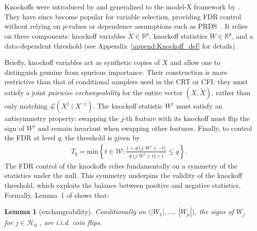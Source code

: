 \documentclass{article}
\theoremstyle{plain}
\newtheorem{lemma}[theorem]{Lemma}
\theoremstyle{definition}
\theoremstyle{remark}
\begin{document}
 

Knockoffs were introduced by \citet{barber-candes2015} and generalized to the model-X framework by \citet{candes2018panning}. They have since become popular for variable selection, providing FDR control without relying on $p$-values or dependence assumptions such as PRDS~\cite{BH}. It relies on three components: knockoff variables $\widetilde{X} \in \mathbb{R}^p$, knockoff statistics $W \in \mathbb{R}^p$, and a data-dependent threshold (see Appendix~\ref{append:Knockoff_def} for details).

Briefly, knockoff variables act as synthetic copies of $X$ and allow one to distinguish genuine from spurious importance. Their construction is more restrictive than that of conditional samplers used in the CRT or CFI: they must satisfy a joint \emph{pairwise exchangeability} for the entire vector $(X, \widetilde{X})$, rather than only matching $\mathcal{L}(X^j \mid X^{-j})$. The knockoff statistic $W^j$ must satisfy an antisymmetry property: swapping the $j$-th feature with its knockoff must flip the sign of $W^j$ and remain invariant when swapping other features. Finally, to control the FDR at level $q$, the threshold is given by
%
 \begin{align}
    T_q=\mathrm{min}\left\{t\in \mathcal{W}:\frac{1+\#\{j:W^j\leq -t\}}{\#\{j:W^j\geq t\}\vee 1}\leq q \right\}.\label{eq:knockoff-threshold}
\end{align}
%
The FDR control of the knockoffs relies fundamentally on a symmetry of the statistics under the null. This symmetry underpins the validity of the knockoff threshold, which exploits the balance between positive and negative statistics. Formally, Lemma~1 of \citet{candes2018panning} shows that:
%
 \begin{lemma}[exchangeability]\label{lemma:exchang}
     Conditionally on $(|W_1|,\ldots, $ $|W_p|)$, the signs of $W_j$ for $j\in \mathcal{H}_0$ , are i.i.d. coin ﬂips.
 \end{lemma}
 
\end{document}
